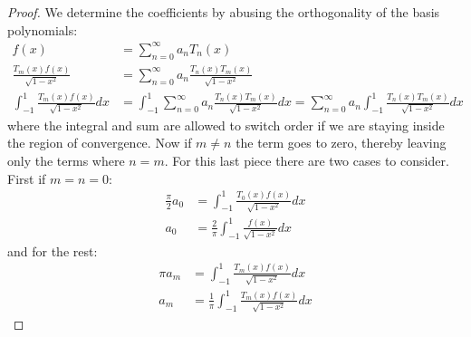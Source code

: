 \documentclass[12pt, letterpaper, onecolumn, conference, final]{IEEEtran}
\theoremstyle{definition}
\newtheorem{proposition}{Proposition}
\theoremstyle{plain}
\begin{document}
\begin{center}
\end{center}

\begin{proof}
We determine the coefficients by abusing the orthogonality of the basis polynomials:
\begin{equation*}
\begin{split}
f(x) &= \sum_{n = 0}^\infty a_nT_n(x) \\
\frac{T_m(x)f(x)}{\sqrt{1 - x^2}} &= \sum_{n = 0}^\infty a_n \frac{T_n(x)T_m(x)}{\sqrt{1 - x^2}} \\
\int_{-1}^1 \frac{T_m(x)f(x)}{\sqrt{1 - x^2}} dx &= \int_{-1}^1 \sum_{n = 0}^\infty a_n \frac{T_n(x)T_m(x)}{\sqrt{1 - x^2}} dx = \sum_{n = 0}^\infty a_n \int_{-1}^1 \frac{T_n(x)T_m(x)}{\sqrt{1 - x^2}} dx
\end{split}
\end{equation*}
where the integral and sum are allowed to switch order if we are staying inside the region of convergence. Now if $m \neq n$ the term goes to zero, thereby leaving only the terms where $n = m$. For this last piece there are two cases to consider. First if $m = n = 0$:
\begin{equation*}
\begin{split}
\frac{\pi}{2}a_0 &= \int_{-1}^1 \frac{T_0(x)f(x)}{\sqrt{1 - x^2}} dx \\
a_0 &= \frac{2}{\pi} \int_{-1}^1 \frac{f(x)}{\sqrt{1 - x^2}} dx
\end{split}
\end{equation*}
and for the rest:
\begin{equation*}
\begin{split}
\pi a_m &= \int_{-1}^1 \frac{T_m(x)f(x)}{\sqrt{1 - x^2}} dx \\
a_m &= \frac{1}{\pi} \int_{-1}^1 \frac{T_m(x)f(x)}{\sqrt{1 - x^2}} dx
\end{split}
\end{equation*}
\end{proof}
\end{document}

